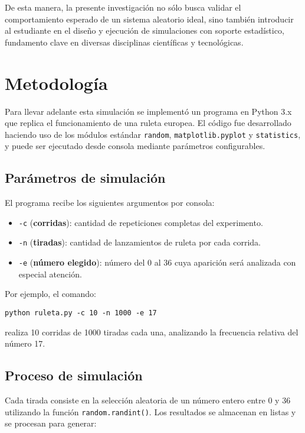 \documentclass{article}
\begin{document}
De esta manera, la presente investigación no sólo busca validar el comportamiento esperado de un sistema aleatorio ideal, sino también introducir al estudiante en el diseño y ejecución de simulaciones con soporte estadístico, fundamento clave en diversas disciplinas científicas y tecnológicas.



\section{Metodología}

Para llevar adelante esta simulación se implementó un programa en Python 3.x que replica el funcionamiento de una ruleta europea. El código fue desarrollado haciendo uso de los módulos estándar \texttt{random}, \texttt{matplotlib.pyplot} y \texttt{statistics}, y puede ser ejecutado desde consola mediante parámetros configurables.

\subsection{Parámetros de simulación}

El programa recibe los siguientes argumentos por consola:

\begin{itemize}
    \item \texttt{-c} (\textbf{corridas}): cantidad de repeticiones completas del experimento.
    \item \texttt{-n} (\textbf{tiradas}): cantidad de lanzamientos de ruleta por cada corrida.
    \item \texttt{-e} (\textbf{número elegido}): número del 0 al 36 cuya aparición será analizada con especial atención.
\end{itemize}

Por ejemplo, el comando:

\begin{center}
\texttt{python ruleta.py -c 10 -n 1000 -e 17}
\end{center}

realiza 10 corridas de 1000 tiradas cada una, analizando la frecuencia relativa del número 17.

\subsection{Proceso de simulación}

Cada tirada consiste en la selección aleatoria de un número entero entre 0 y 36 utilizando la función \texttt{random.randint()}. Los resultados se almacenan en listas y se procesan para generar:
\end{document}
